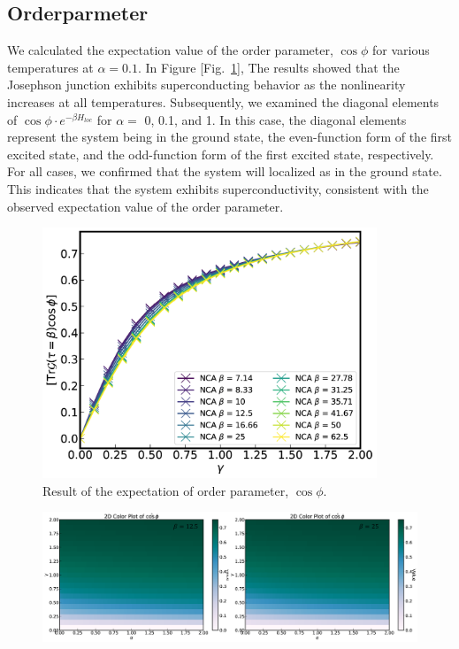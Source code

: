 \documentclass{article}[12pt]
\begin{document}
\begin{spacing}{1.5}
\subsection{Orderparmeter}
We calculated the expectation value of the order parameter, $\cos\phi$ for various temperatures at $\alpha = 0.1$. 
In Figure [Fig.~\ref{fig:Order1}], The results showed that the Josephson junction exhibits superconducting behavior as the nonlinearity increases at all temperatures. 
Subsequently, we examined the diagonal elements of $\cos\phi \cdot e^{−βH_{loc}}$ for $\alpha=$ 0, 0.1, and 1. 
In this case, the diagonal elements represent the system being in the ground state, the even-function form of the first excited state, 
and the odd-function form of the first excited state, respectively. 
For all cases, we confirmed that the system will localized as in the ground state. 
This indicates that the system exhibits superconductivity, consistent with the observed expectation value of the order parameter.\\
\begin{figure}[htbp]
  \centerline{\includegraphics[width=10cm]{TexFigure/Expec_alp_0.1 (1).png}}
  \caption{Result of the expectation of order parameter, $\cos\phi$.}
  \label{fig:Order1}
\end{figure}
\begin{figure}[htbp]
  \centerline{\includegraphics[width=16cm]{TexFigure/Order_color.png}}

\end{figure}
\end{spacing}
\end{document}
